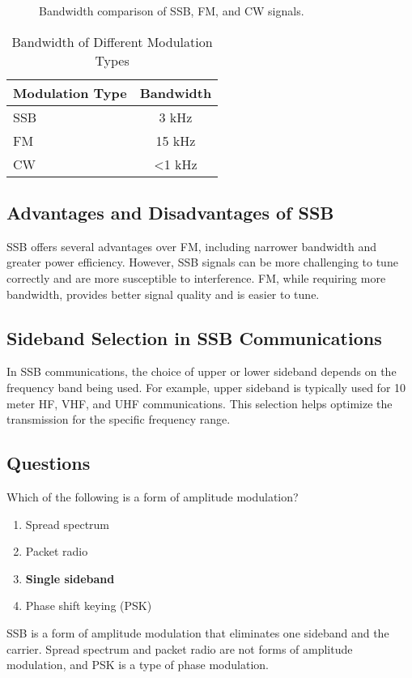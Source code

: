 \begin{figure}[h!]
    \centering
    \caption{Bandwidth comparison of SSB, FM, and CW signals.}
    \label{fig:bandwidth_comparison}
\end{figure}

\begin{table}[h!]
    \centering
    \begin{tabular}{|l|c|}
        \hline
        \textbf{Modulation Type} & \textbf{Bandwidth} \\
        \hline
        SSB & 3 kHz \\
        FM & 15 kHz \\
        CW & <1 kHz \\
        \hline
    \end{tabular}
    \caption{Bandwidth of Different Modulation Types}
    \label{tab:bandwidth_summary}
\end{table}

\subsection*{Advantages and Disadvantages of SSB}
SSB offers several advantages over FM, including narrower bandwidth and greater power efficiency. However, SSB signals can be more challenging to tune correctly and are more susceptible to interference. FM, while requiring more bandwidth, provides better signal quality and is easier to tune.

\subsection*{Sideband Selection in SSB Communications}
In SSB communications, the choice of upper or lower sideband depends on the frequency band being used. For example, upper sideband is typically used for 10 meter HF, VHF, and UHF communications. This selection helps optimize the transmission for the specific frequency range.

\subsection*{Questions}
\begin{tcolorbox}[colback=gray!10!white,colframe=black!75!black,title={T8A01}]
    Which of the following is a form of amplitude modulation?
    \begin{enumerate}[label=\Alph*,noitemsep]
        \item Spread spectrum
        \item Packet radio
        \item \textbf{Single sideband}
        \item Phase shift keying (PSK)
    \end{enumerate}
\end{tcolorbox}
SSB is a form of amplitude modulation that eliminates one sideband and the carrier. Spread spectrum and packet radio are not forms of amplitude modulation, and PSK is a type of phase modulation.

